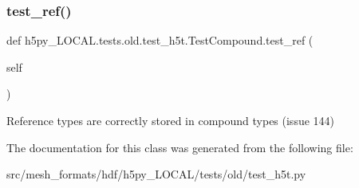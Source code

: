 \subsubsection{\texorpdfstring{test\+\_\+ref()}{test\_ref()}}
{\footnotesize\ttfamily def h5py\+\_\+\+L\+O\+C\+A\+L.\+tests.\+old.\+test\+\_\+h5t.\+Test\+Compound.\+test\+\_\+ref (\begin{DoxyParamCaption}\item[{}]{self }\end{DoxyParamCaption})}

\begin{DoxyVerb}Reference types are correctly stored in compound types (issue 144)
\end{DoxyVerb}
 

The documentation for this class was generated from the following file\+:\begin{DoxyCompactItemize}
\item 
src/mesh\+\_\+formats/hdf/h5py\+\_\+\+L\+O\+C\+A\+L/tests/old/test\+\_\+h5t.\+py\end{DoxyCompactItemize}
